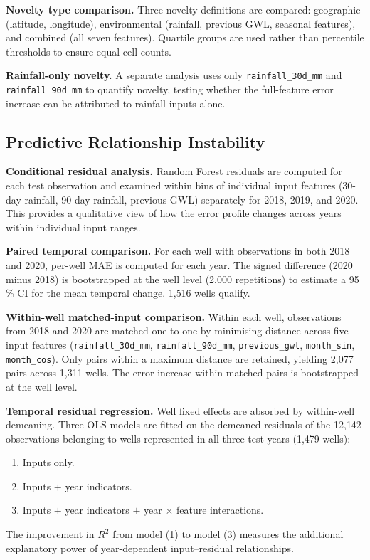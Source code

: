 \documentclass[conference]{IEEEtran}
\begin{document}
\textbf{Novelty type comparison.}
Three novelty definitions are compared: geographic (latitude, longitude),
environmental (rainfall, previous GWL, seasonal features), and combined
(all seven features).
Quartile groups are used rather than percentile thresholds to ensure equal
cell counts.

\textbf{Rainfall-only novelty.}
A separate analysis uses only \texttt{rainfall\_30d\_mm} and
\texttt{rainfall\_90d\_mm} to quantify novelty, testing whether the
full-feature error increase can be attributed to rainfall inputs alone.

\subsection{Predictive Relationship Instability}

\textbf{Conditional residual analysis.}
Random Forest residuals are computed for each test observation and
examined within bins of individual input features (30-day rainfall,
90-day rainfall, previous GWL) separately for 2018, 2019, and 2020.
This provides a qualitative view of how the error profile changes across
years within individual input ranges.

\textbf{Paired temporal comparison.}
For each well with observations in both 2018 and 2020, per-well MAE is
computed for each year.
The signed difference (2020 minus 2018) is bootstrapped at the well level
(2{,}000 repetitions) to estimate a 95\,\% CI for the mean temporal change.
1{,}516 wells qualify.

\textbf{Within-well matched-input comparison.}
Within each well, observations from 2018 and 2020 are matched one-to-one
by minimising distance across five input features
(\texttt{rainfall\_30d\_mm}, \texttt{rainfall\_90d\_mm},
\texttt{previous\_gwl}, \texttt{month\_sin}, \texttt{month\_cos}).
Only pairs within a maximum distance are retained, yielding 2{,}077 pairs
across 1{,}311 wells.
The error increase within matched pairs is bootstrapped at the well level.

\textbf{Temporal residual regression.}
Well fixed effects are absorbed by within-well demeaning.
Three OLS models are fitted on the demeaned residuals of the 12{,}142
observations belonging to wells represented in all three test years
(1{,}479 wells):
\begin{enumerate}
  \item Inputs only.
  \item Inputs $+$ year indicators.
  \item Inputs $+$ year indicators $+$ year $\times$ feature interactions.
\end{enumerate}
The improvement in $R^{2}$ from model (1) to model (3) measures the
additional explanatory power of year-dependent input--residual
relationships.
\end{document}
